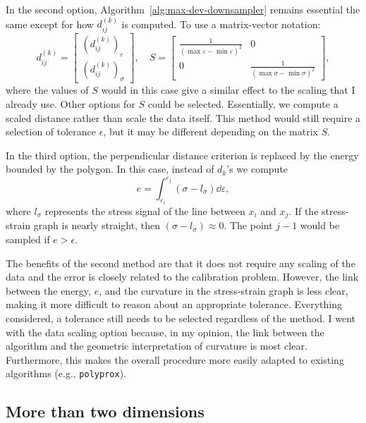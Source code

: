 \documentclass[a4paper,11pt]{article}
\begin{document}
In the second option, Algorithm~\ref{alg:max-dev-downsampler} remains essential the same except for how $d^{(k)}_{ij}$ is computed.
To use a matrix-vector notation:
\begin{equation*}
    d^{(k)}_{ij} = \begin{bmatrix}
        (d^{(k)}_{ij})_{\varepsilon} \\
        (d^{(k)}_{ij})_{\sigma}
    \end{bmatrix}, \quad
    S = \begin{bmatrix}
        \frac{1}{(\max \varepsilon - \min \varepsilon)^2} & 0 \\
        0 & \frac{1}{(\max \sigma - \min \sigma)^2}
    \end{bmatrix},
\end{equation*}
where the values of $S$ would in this case give a similar effect to the scaling that I already use.
Other options for $S$ could be selected.
Essentially, we compute a scaled distance rather than scale the data itself.
This method would still require a selection of tolerance $\epsilon$, but it may be different depending on the matrix $S$.

In the third option, the perpendicular distance criterion is replaced by the energy bounded by the polygon.
In this case, instead of $d_k$'s we compute
\begin{equation*}
    e = \int_{\varepsilon_i}^{\varepsilon_j} (\sigma - l_\sigma) \dd \varepsilon,
\end{equation*}
where $l_\sigma$ represents the stress signal of the line between $x_i$ and $x_j$.
If the stress-strain graph is nearly straight, then $(\sigma - l_\sigma) \approx 0$.
The point $j-1$ would be sampled if $e > \epsilon$.

The benefits of the second method are that it does not require any scaling of the data and the error is closely related to the calibration problem.
However, the link between the energy, $e$, and the curvature in the stress-strain graph is less clear, making it more difficult to reason about an appropriate tolerance.
Everything considered, a tolerance still needs to be selected regardless of the method.
I went with the data scaling option because, in my opinion, the link between the algorithm and the geometric interpretation of curvature is most clear.
Furthermore, this makes the overall procedure more easily adapted to existing algorithms (e.g., \texttt{polyprox}).

\subsection{More than two dimensions}
\end{document}
